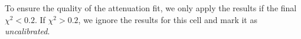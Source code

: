 \documentclass[12pt,a4paper]{article}
\begin{document}
To ensure the quality of the attenuation fit, we only apply the results if the final $\chi^2<0.2$. If $\chi^2>0.2$, we ignore the results for this cell and mark it as \textit{uncalibrated}.



\end{document}
